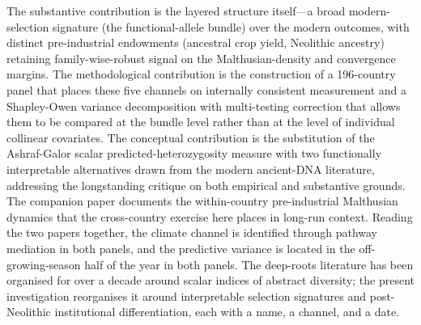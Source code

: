 \documentclass[11pt,letterpaper]{article}
\begin{document}
The substantive contribution is the layered structure itself---a broad modern-selection signature (the functional-allele bundle) over the modern outcomes, with distinct pre-industrial endowments (ancestral crop yield, Neolithic ancestry) retaining family-wise-robust signal on the Malthusian-density and convergence margins. The methodological contribution is the construction of a 196-country panel that places these five channels on internally consistent measurement and a Shapley-Owen variance decomposition with multi-testing correction that allows them to be compared at the bundle level rather than at the level of individual collinear covariates. The conceptual contribution is the substitution of the Ashraf-Galor scalar predicted-heterozygosity measure with two functionally interpretable alternatives drawn from the modern ancient-DNA literature, addressing the longstanding \citet{guedes2013} critique on both empirical and substantive grounds. The companion paper \citep{alonso_long_shadow} documents the within-country pre-industrial Malthusian dynamics that the cross-country exercise here places in long-run context. Reading the two papers together, the climate channel is identified through pathway mediation in both panels, and the predictive variance is located in the off-growing-season half of the year in both panels. The deep-roots literature has been organised for over a decade around scalar indices of abstract diversity; the present investigation reorganises it around interpretable selection signatures and post-Neolithic institutional differentiation, each with a name, a channel, and a date.
\end{document}
